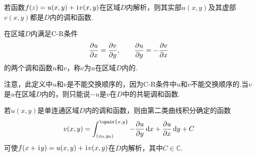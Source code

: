 \begin{theorem}
若函数\(f(z)=u(x,y)+\kern1pt\mathrm{i}\kern1pt v(x,y)\)在区域\(D\)内解析，则其实部\(u(x,y)\)及其虚部\(v(x,y)\)都是\(D\)内的调和函数.
\end{theorem}

\begin{definition}
在区域\(D\)内满足C-R条件\[
\pdv{u}{x}=\pdv{v}{y}, \qquad \pdv{u}{y}=-\pdv{v}{x}
\]的两个调和函数\(u\)和\(v\)，称\(v\)为\(u\)在区域\(D\)内的.
\end{definition}
注意，此定义中\(u\)和\(v\)是不能交换顺序的，因为C-R条件中\(u\)和\(v\)不能交换顺序的.当\(v\)是\(u\)在区域\(D\)内的，则只能说\(-u\)是\(v\)在\(D\)中的共轭调和函数.

\begin{theorem}
若\(u(x,y)\)是单连通区域\(D\)内的调和函数，则由第二类曲线积分确定的函数\[
v(x,y)=\int_{(x_0,y_0)}^{\opair{x,y}}
-\pdv{u}{y} \dd{x} + \pdv{u}{x} \dd{y} + C
\]可使\(f(x+\kern1pt\mathrm{i}\kern1pt y)=u(x,y)+\kern1pt\mathrm{i}\kern1pt v(x,y)\)在\(D\)内解析，其中\(C\in\mathbb{C}\).
\end{theorem}
